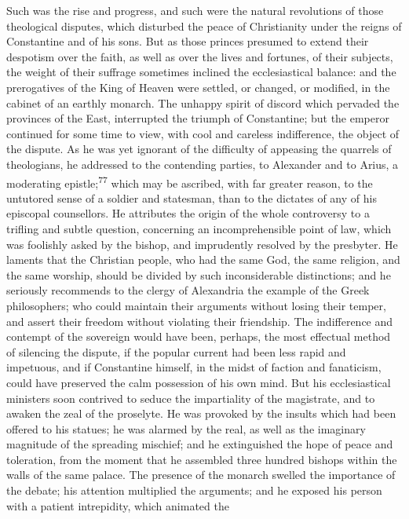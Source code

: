 Such was the rise and progress, and such were the natural
revolutions of those theological disputes, which disturbed the
peace of Christianity under the reigns of Constantine and of his
sons. But as those princes presumed to extend their despotism
over the faith, as well as over the lives and fortunes, of their
subjects, the weight of their suffrage sometimes inclined the
ecclesiastical balance: and the prerogatives of the King of
Heaven were settled, or changed, or modified, in the cabinet of
an earthly monarch. The unhappy spirit of discord which pervaded
the provinces of the East, interrupted the triumph of
Constantine; but the emperor continued for some time to view,
with cool and careless indifference, the object of the dispute.
As he was yet ignorant of the difficulty of appeasing the
quarrels of theologians, he addressed to the contending parties,
to Alexander and to Arius, a moderating epistle;\textsuperscript{77} which may be
ascribed, with far greater reason, to the untutored sense of a
soldier and statesman, than to the dictates of any of his
episcopal counsellors. He attributes the origin of the whole
controversy to a trifling and subtle question, concerning an
incomprehensible point of law, which was foolishly asked by the
bishop, and imprudently resolved by the presbyter. He laments
that the Christian people, who had the same God, the same
religion, and the same worship, should be divided by such
inconsiderable distinctions; and he seriously recommends to the
clergy of Alexandria the example of the Greek philosophers; who
could maintain their arguments without losing their temper, and
assert their freedom without violating their friendship. The
indifference and contempt of the sovereign would have been,
perhaps, the most effectual method of silencing the dispute, if
the popular current had been less rapid and impetuous, and if
Constantine himself, in the midst of faction and fanaticism,
could have preserved the calm possession of his own mind. But his
ecclesiastical ministers soon contrived to seduce the
impartiality of the magistrate, and to awaken the zeal of the
proselyte. He was provoked by the insults which had been offered
to his statues; he was alarmed by the real, as well as the
imaginary magnitude of the spreading mischief; and he
extinguished the hope of peace and toleration, from the moment
that he assembled three hundred bishops within the walls of the
same palace. The presence of the monarch swelled the importance
of the debate; his attention multiplied the arguments; and he
exposed his person with a patient intrepidity, which animated the
